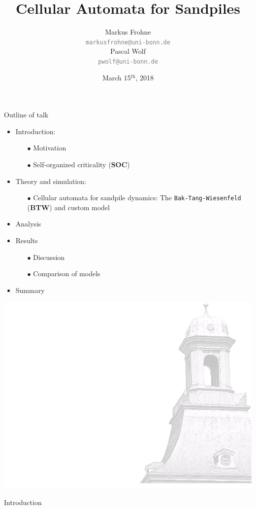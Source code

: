 \documentclass[xcolor=dvipsnames]{beamer}
\title[Sandpiles]{Cellular Automata for Sandpiles}
\author[M. Frohne \& P. Wolf]{Markus Frohne\\ \texttt{\textcolor{gray}{markusfrohne@uni-bonn.de}}\\ \vspace{0.33cm} Pascal Wolf\\ \texttt{\textcolor{gray}{pwolf@uni-bonn.de}}}
\date{March 15$^\text{th}$, 2018}
\newcommand{\myitemsep}{\setlength\itemsep{0.33cm}}
\newcommand{\mysubitemsep}{\setlength\itemsep{0.22cm}}
\begin{document}
	
	\begin{frame}
		\titlepage
	\end{frame}
	
	\begin{frame}{Outline of talk}
		\begin{itemize}
			\myitemsep
			\item {Introduction:
				\vspace{0.22cm}
				\begin{itemize}
					\mysubitemsep
					\item[$\bullet$] Motivation
					\item[$\bullet$] Self-organized criticality (\textbf{SOC})
				\end{itemize}
				}
			\item {Theory and simulation:
				\vspace{0.22cm}
				\begin{itemize}
					\mysubitemsep
					\item[$\bullet$] Cellular automata for sandpile dynamics: The \texttt{Bak-Tang-Wiesenfeld} (\textbf{BTW}) and custom model
				\end{itemize}}
			\item Analysis
			\item {Results
				\vspace{0.22cm}
				\begin{itemize}
					\mysubitemsep
					\item[$\bullet$] Discussion
					\item[$\bullet$] Comparison of models
				\end{itemize}}
			\item Summary
		\end{itemize}
	\end{frame}
	
	{\usebackgroundtemplate%
		{%
			\includegraphics[width=\paperwidth,height=\paperheight]{bkg1.pdf}%
		}
		\begin{frame}
			\centering \Huge \color{ublue} Introduction
			\thispagestyle{empty}
			\addtocounter{framenumber}{-1}
		\end{frame}
	}
	
\end{document}

